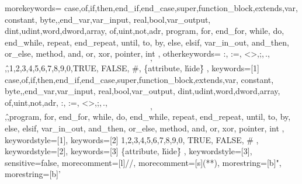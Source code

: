 

{
	morekeywords={
		case,of,if,then,end_if,end_case,super,function_block,extends,var,
		constant, byte,,end_var,var_input, real,bool,var_output,
		dint,udint,word,dword,array, of,uint,not,adr, program, for, end_for, while, do, end_while, repeat, end_repeat, until, to, by, else, elsif, var_in_out, and_then, or_else, method, and, or, xor, pointer, int
	},
	otherkeywords={
		:, :=, <>,;,\,.,\[,\],\^,1,2,3,4,5,6,7,8,9,0,TRUE, FALSE, \#, \{attribute,  \'hide\'\}
	},
	keywords=[1]{
		case,of,if,then,end_if,end_case,super,function_block,extends,var,
		constant, byte,,end_var,var_input, real,bool,var_output,
		dint,udint,word,dword,array, of,uint,not,adr, :, :=, <>,;,\,.,\[,\],\^,program, for, end_for, while, do, end_while, repeat, end_repeat, until, to, by, else, elsif, var_in_out, and_then, or_else, method, and, or, xor, pointer, int
	},
	keywordstyle=[1]\color{blue},
	keywords=[2]{
		1,2,3,4,5,6,7,8,9,0, TRUE, FALSE, \#
	},
	keywordstyle=[2]\color{codepurple},
	keywords=[3]{
		\{attribute,  \'hide\'\}
	},
	keywordstyle=[3]\color{codegray},
	sensitive=false,
	morecomment=[l]{//}, 
	morecomment=[s]{(*}{*)},
	morestring=[b]{"},
	morestring=[b]{'}
}


